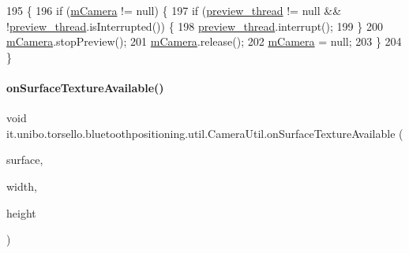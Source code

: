 \begin{DoxyCode}
195                           \{
196         \textcolor{keywordflow}{if} (\hyperlink{classit_1_1unibo_1_1torsello_1_1bluetoothpositioning_1_1util_1_1CameraUtil_ac3d03bd30262a62e27b80e7bab97b40b_ac3d03bd30262a62e27b80e7bab97b40b}{mCamera} != null) \{
197             \textcolor{keywordflow}{if} (\hyperlink{classit_1_1unibo_1_1torsello_1_1bluetoothpositioning_1_1util_1_1CameraUtil_a49f1624f6df81b6a7604b5928c17d443_a49f1624f6df81b6a7604b5928c17d443}{preview\_thread} != null && !\hyperlink{classit_1_1unibo_1_1torsello_1_1bluetoothpositioning_1_1util_1_1CameraUtil_a49f1624f6df81b6a7604b5928c17d443_a49f1624f6df81b6a7604b5928c17d443}{preview\_thread}.isInterrupted()) \{
198                 \hyperlink{classit_1_1unibo_1_1torsello_1_1bluetoothpositioning_1_1util_1_1CameraUtil_a49f1624f6df81b6a7604b5928c17d443_a49f1624f6df81b6a7604b5928c17d443}{preview\_thread}.interrupt();
199             \}
200             \hyperlink{classit_1_1unibo_1_1torsello_1_1bluetoothpositioning_1_1util_1_1CameraUtil_ac3d03bd30262a62e27b80e7bab97b40b_ac3d03bd30262a62e27b80e7bab97b40b}{mCamera}.stopPreview();
201             \hyperlink{classit_1_1unibo_1_1torsello_1_1bluetoothpositioning_1_1util_1_1CameraUtil_ac3d03bd30262a62e27b80e7bab97b40b_ac3d03bd30262a62e27b80e7bab97b40b}{mCamera}.release();
202             \hyperlink{classit_1_1unibo_1_1torsello_1_1bluetoothpositioning_1_1util_1_1CameraUtil_ac3d03bd30262a62e27b80e7bab97b40b_ac3d03bd30262a62e27b80e7bab97b40b}{mCamera} = null;
203         \}
204     \}
\end{DoxyCode}
\hypertarget{classit_1_1unibo_1_1torsello_1_1bluetoothpositioning_1_1util_1_1CameraUtil_ae57c993ba40e5d0a601e246abc67b919_ae57c993ba40e5d0a601e246abc67b919}{}\label{classit_1_1unibo_1_1torsello_1_1bluetoothpositioning_1_1util_1_1CameraUtil_ae57c993ba40e5d0a601e246abc67b919_ae57c993ba40e5d0a601e246abc67b919} 
\paragraph{\texorpdfstring{on\+Surface\+Texture\+Available()}{onSurfaceTextureAvailable()}}
{\footnotesize\ttfamily void it.\+unibo.\+torsello.\+bluetoothpositioning.\+util.\+Camera\+Util.\+on\+Surface\+Texture\+Available (\begin{DoxyParamCaption}\item[{final Surface\+Texture}]{surface,  }\item[{int}]{width,  }\item[{int}]{height }\end{DoxyParamCaption})}


